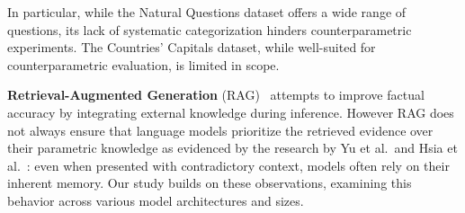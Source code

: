 In particular, while the Natural Questions dataset offers a wide range of questions, its lack of systematic categorization hinders counterparametric experiments.
The Countries' Capitals dataset, while well-suited for counterparametric evaluation, is limited in scope.

\textbf{Retrieval-Augmented Generation} (RAG)~\cite{rag} attempts to improve factual accuracy by integrating external knowledge during inference.
However RAG does not always ensure that language models prioritize the retrieved evidence over their parametric knowledge as evidenced by the research by Yu et al.\ and Hsia et al.~\cite{ragged,factual_recall}: even when presented with contradictory context, models often rely on their inherent memory.
Our study builds on these observations, examining this behavior across various model architectures and sizes.
